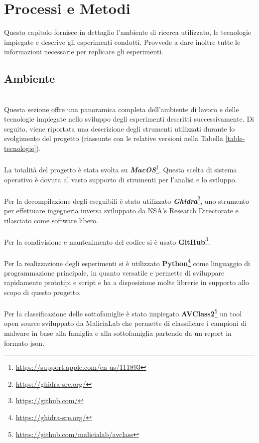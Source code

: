 \chapter{Processi e Metodi}
\label{cap:processi-metodologie}

\indent Questo capitolo fornisce in dettaglio l'ambiente di ricerca utilizzato, le tecnologie impiegate e descrive gli esperimenti condotti. 
Provvede a dare inoltre tutte le informazioni necessarie per replicare gli esperimenti.

\section{Ambiente}
~\\
\indent Questa sezione offre una panoramica completa dell'ambiente di lavoro e delle tecnologie impiegate nello sviluppo degli esperimenti descritti successivamente. 
Di seguito, viene riportata una descrizione degli strumenti utilizzati durante lo svolgimento del progetto (riassunte con le relative versioni nella Tabella \ref{table-tecnologie}).
\\\\
La totalità del progetto è stata svolta su \textbf{\emph{MacOS}}\footnote{\url{https://support.apple.com/en-us/111893}}. 
Questa scelta di sistema operativo è dovuta al vasto supporto di strumenti per l'analisi e lo sviluppo.
\\\\
Per la decompilazione degli eseguibili è stato utilizzato \textbf{\emph{Ghidra}}\footnote{\url{https://ghidra-sre.org/}}, 
uno strumento per effettuare ingegneria inversa sviluppato da NSA's Research Directorate e rilasciato come software libero.
\\\\
Per la condivisione e mantenimento del codice si è usato \textbf{GitHub}\footnote{\url{https://github.com/}}.
\\\\
Per la realizzazione degli esperimenti si è utilizzato \textbf{Python}\footnote{\url{https://ghidra-sre.org/}} come linguaggio di programmazione principale, in quanto versatile e permette di sviluppare rapidamente prototipi e script e ha a disposizione molte librerie in supporto allo scopo di questo progetto.
\\\\
Per la classificazione delle sottofamiglie è stato impiegato \textbf{AVClass2}\footnote{\url{https://github.com/malicialab/avclass}}
un tool open source sviluppato da MaliciaLab che permette di classificare i campioni di malware in base alla famiglia e alla sottofamiglia partendo da un report in formato json.
